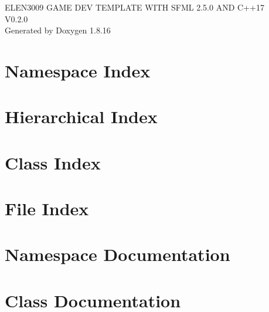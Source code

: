 \let\mypdfximage\pdfximage\def\pdfximage{\immediate\mypdfximage}\documentclass[twoside]{book}
\newcommand{\+}{\discretionary{\mbox{\scriptsize$\hookleftarrow$}}{}{}}
\newcommand{\clearemptydoublepage}{%
  \newpage{\pagestyle{empty}\cleardoublepage}%
}
\begin{document}
\hypersetup{pageanchor=false,
             bookmarksnumbered=true,
             pdfencoding=unicode
            }
\begin{titlepage}
\vspace*{7cm}
\begin{center}%
{\Large E\+L\+E\+N3009 G\+A\+ME D\+EV T\+E\+M\+P\+L\+A\+TE W\+I\+TH S\+F\+ML 2.5.0 A\+ND C++17 \\[1ex]\large V0.\+2.\+0 }\\
\vspace*{1cm}
{\large Generated by Doxygen 1.8.16}\\
\end{center}
\end{titlepage}
\clearemptydoublepage
{}
\tableofcontents
\clearemptydoublepage
{}
\hypersetup{pageanchor=true}

\chapter{Namespace Index}

\chapter{Hierarchical Index}

\chapter{Class Index}

\chapter{File Index}

\chapter{Namespace Documentation}




\chapter{Class Documentation}

























\end{document}
